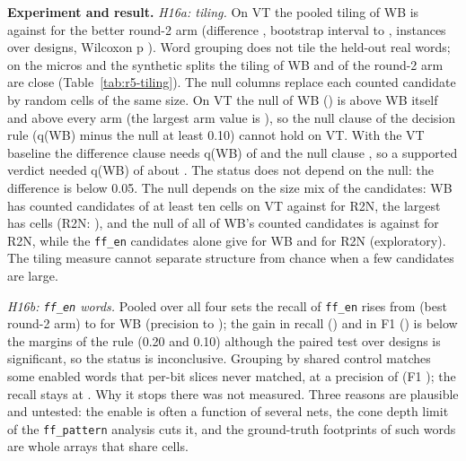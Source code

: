 \documentclass[conference]{IEEEtran}
\newcommand{\hev}[1]{\par\smallskip\noindent\textbf{#1}}
\newcommand{\code}[1]{\texttt{#1}}
\begin{document}
\hev{Experiment and result.} \emph{H16a: tiling.} On VT the pooled tiling of WB is \rfvHaqwb{} against \rfvHaqbase{} for the
better round-2 arm (difference \rfvHadeltaq{}, bootstrap interval \rfvHadeltaqlo{} to
\rfvHadeltaqhi{}, \rfvHaninstances{} instances over \rfvHadesigns{} designs, Wilcoxon p
\rfvHawilcoxonp{}). Word grouping does not tile the held-out real words; on the micros and the
synthetic splits the tiling of WB and of the round-2 arm are close (Table~\ref{tab:r5-tiling}).
The null columns replace each counted candidate by random cells of the same size. On VT the null
of WB (\rfvHaqnull{}) is above WB itself and above every arm (the largest arm value is
\rfvHaqarmmaxvt{}), so the null clause of the decision rule (q(WB) minus the null at least 0.10)
cannot hold on VT. With the VT baseline the difference clause needs q(WB) of
\rfvHareachqdiff{} and the null clause \rfvHareachqnull{}, so a supported verdict needed
q(WB) of about \rfvHareachq{}. The status does not depend on the null: the difference is below
0.05. The null depends on the size mix of the candidates: WB has \rfvXNullVtWbAllBig{} counted
candidates of at least ten cells on VT against \rfvXNullVtRtwoNAllBig{} for R2N, the largest has
\rfvXNullVtWbAllMax{} cells (R2N: \rfvXNullVtRtwoNAllMax{}), and the null of all of WB's counted
candidates is \rfvXNullVtWbAllNull{} against \rfvXNullVtRtwoNAllNull{} for R2N, while the
\code{ff\_en} candidates alone give \rfvXNullVtWbFfenNull{} for WB and \rfvXNullVtRtwoNFfenNull{} for
R2N (exploratory). The tiling measure cannot separate structure from
chance when a few candidates are large.

\emph{H16b: \code{ff\_en} words.} Pooled over all four sets the recall of \code{ff\_en} rises from
\rfvHbrecallbase{} (best round-2 arm) to \rfvHbrecallwb{} for WB (precision \rfvHbprecisionbase{}
to \rfvHbprecisionwb{}); the gain in recall (\rfvHbdeltarecall{}) and in F1 (\rfvHbdeltafone{}) is
below the margins of the rule (0.20 and 0.10) although the paired test over \rfvHbdesignswithgt{}
designs is significant, so the status is inconclusive. Grouping by shared control matches some
enabled words that per-bit slices never matched, at a precision of \rfvHbprecisionwb{} (F1
\rfvHbfonewb{}); the recall stays at \rfvHbrecallwb{}. Why it stops there was not measured. Three
reasons are plausible and untested: the enable is often a function of several nets, the cone depth
limit of the \code{ff\_pattern} analysis cuts it, and the ground-truth footprints of such words
are whole arrays that share cells.
\end{document}
